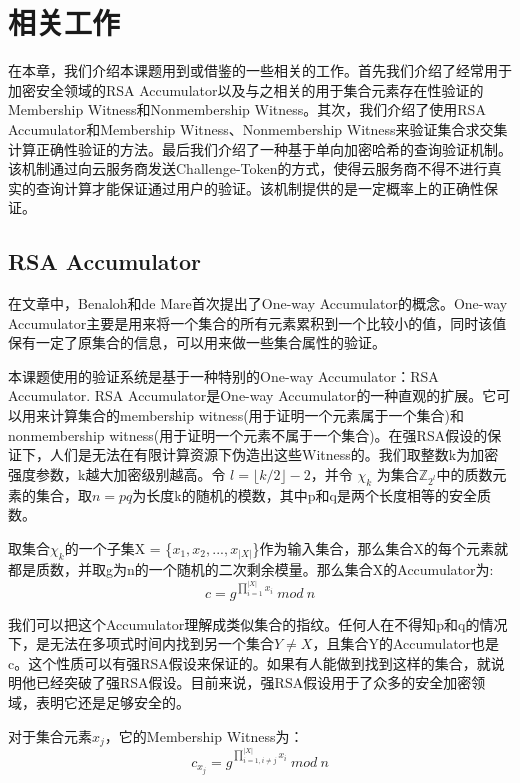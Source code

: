 \chapter{相关工作}
\label{chap:relatedwork}
在本章，我们介绍本课题用到或借鉴的一些相关的工作。首先我们介绍了经常用于加密安全领域的RSA Accumulator\cite{goodrich2002efficient,verifiableindex}以及与之相关的用于集合元素存在性验证的Membership Witness和Nonmembership Witness。其次，我们介绍了使用RSA Accumulator和Membership Witness、Nonmembership Witness来验证集合求交集计算正确性验证的方法。最后我们介绍了一种基于单向加密哈希的查询验证机制。该机制通过向云服务商发送Challenge-Token的方式，使得云服务商不得不进行真实的查询计算才能保证通过用户的验证。该机制提供的是一定概率上的正确性保证。

\section{RSA Accumulator}
在文章\cite{benaloh1994one}中，Benaloh和de Mare首次提出了One-way Accumulator的概念。One-way Accumulator主要是用来将一个集合的所有元素累积到一个比较小的值，同时该值保有一定了原集合的信息，可以用来做一些集合属性的验证。

本课题使用的验证系统是基于一种特别的One-way Accumulator：RSA Accumulator\cite{goodrich2002efficient}.
RSA Accumulator是One-way Accumulator\cite{benaloh1994one}的一种直观的扩展。它可以用来计算集合的membership witness(用于证明一个元素属于一个集合)和nonmembership witness(用于证明一个元素不属于一个集合)。在强RSA假设的保证下\cite{baric1997collision}，人们是无法在有限计算资源下伪造出这些Witness的。我们取整数k为加密强度参数，k越大加密级别越高。令 $l = \lfloor k/2 \rfloor - 2$，并令 $\chi_k$ 为集合$\mathbb{Z}_{2^l}$中的质数元素的集合，取$n = pq$为长度k的随机的模数，其中p和q是两个长度相等的安全质数。

取集合$\chi_k$的一个子集X = \{$x_1, x_2, ... , x_{|X|}$\}作为输入集合，那么集合X的每个元素就都是质数，并取g为n的一个随机的二次剩余模量。那么集合X的Accumulator为:
\begin{equation} c = g^{\prod_{i = 1}^{|X|} x_i}\ mod\ n \end{equation}

我们可以把这个Accumulator理解成类似集合的指纹。任何人在不得知p和q的情况下，是无法在多项式时间内找到另一个集合$Y \neq X$，且集合Y的Accumulator也是c。这个性质可以有强RSA假设来保证的。如果有人能做到找到这样的集合，就说明他已经突破了强RSA假设。目前来说，强RSA假设用于了众多的安全加密领域，表明它还是足够安全的。

对于集合元素$x_j$，它的Membership Witness为：
\begin{equation} \label{eq:sw} c_{x_j} = g^{\prod_{i=1, i \ne j}^{|X|} x_i}\ mod\ n \end{equation}

